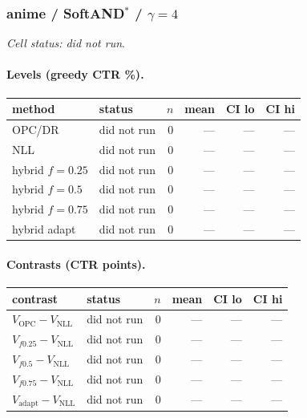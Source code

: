 \documentclass[10pt,a4paper]{article}
\begin{document}
\subsubsection{anime / SoftAND$^*$ / $\gamma=4$}
\emph{Cell status: did not run}.
\paragraph{Levels (greedy CTR \%).}
{\centering\small\begin{tabular}{llrrrr}
\toprule method & status & $n$ & mean & CI lo & CI hi \\
\midrule
OPC/DR & did not run & 0 & --- & --- & --- \\
NLL & did not run & 0 & --- & --- & --- \\
hybrid $f{=}0.25$ & did not run & 0 & --- & --- & --- \\
hybrid $f{=}0.5$ & did not run & 0 & --- & --- & --- \\
hybrid $f{=}0.75$ & did not run & 0 & --- & --- & --- \\
hybrid adapt & did not run & 0 & --- & --- & --- \\
\bottomrule\end{tabular}\par}
\paragraph{Contrasts (CTR points).}
{\centering\small\begin{tabular}{llrrrr}
\toprule contrast & status & $n$ & mean & CI lo & CI hi \\
\midrule
$V_{\mathrm{OPC}}-V_{\mathrm{NLL}}$ & did not run & 0 & --- & --- & --- \\
$V_{f0.25}-V_{\mathrm{NLL}}$ & did not run & 0 & --- & --- & --- \\
$V_{f0.5}-V_{\mathrm{NLL}}$ & did not run & 0 & --- & --- & --- \\
$V_{f0.75}-V_{\mathrm{NLL}}$ & did not run & 0 & --- & --- & --- \\
$V_{\mathrm{adapt}}-V_{\mathrm{NLL}}$ & did not run & 0 & --- & --- & --- \\
\bottomrule\end{tabular}\par}
\end{document}
